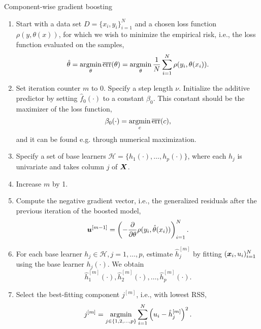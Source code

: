 \begin{algorithm}
\caption{Component-wise gradient boosting}\label{algo:component-wise}
\begin{enumerate}
    \item
        Start with a data set $D=\{x_i, y_i\}_{i=1}^N$ and a chosen loss function $\rho(y,\theta(x))$, for which we wish to
        minimize the empirical risk, i.e., the loss function evaluated on the samples,
        \begin{equation*}
            \hat{\theta}=\operatorname*{argmin}_{\theta}\overline{\text{err}}(\theta)=\operatorname*{argmin}_{\theta}\frac{1}{N}\sum_{i=1}^N\rho(y_i,\theta(x_i)).
        \end{equation*}
    \item
        Set iteration counter $m$ to 0.
        Specify a step length $\nu$.
        Initialize the additive predictor by setting $\hat{f}_0(\cdot)$ to a constant $\beta_0$.
        This constant should be the maximizer of the loss function,
        \begin{equation*}
            \beta_0(\cdot)=\operatorname*{argmin}_c \overline{\text{err}}(c),
        \end{equation*}
        and it can be found e.g. through numerical maximization.
    \item
        Specify a set of base learners $\mathcal{H}=\{h_1(\cdot),\dotsc,h_p(\cdot)\}$, where each $h_j$ is univariate and takes column $j$ of $\bm{X}$.
    \item
        \label{first-step}
        Increase $m$ by 1.
    \item
        Compute the negative gradient vector, i.e., the generalized residuals after the previous iteration of the boosted model,
        \begin{equation*}
            \bm{u}^{[m-1]}=\left(-\frac{\partial}{\partial \theta}\rho(y_i, \hat{\theta}(x_i))\right)_{i=1}^N.
        \end{equation*}
    \item
        For each base learner $h_j\in\mathcal{H},j=1,\ldots,p$, estimate $\hat{h}_{j}^{[m]}$ by fitting $(\bm{x}_i,u_i)_{i=1}^N$ using the base learner $h_j(\cdot)$.
        We obtain
        \begin{equation*}
            \hat{h}_1^{[m]}(\cdot),\hat{h}_2^{[m]}(\cdot),\ldots,\hat{h}_p^{[m]}(\cdot).
        \end{equation*}
    \item
        Select the best-fitting component $j^{[m]}$, i.e., with lowest RSS,
        \begin{equation*}
            j^{[m]}=\argmin_{j\in\{1,2,\ldots,p\}}\sum_{i=1}^N \left(u_i-\hat{h}_j^{[m]}\right)^2.

\end{equation*}
\end{enumerate}
\end{algorithm}
